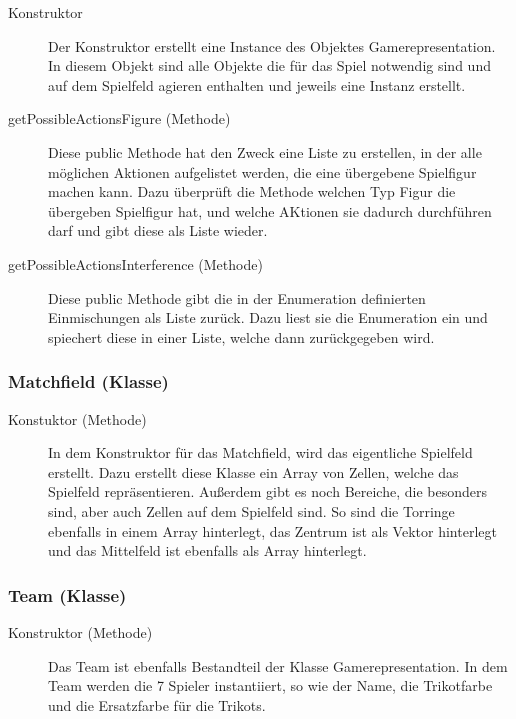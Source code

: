 		\begin{description}
                
			\item[Konstruktor]
			Der Konstruktor erstellt eine Instance des Objektes Gamerepresentation. In diesem Objekt sind alle Objekte die für das Spiel notwendig sind und auf dem Spielfeld agieren enthalten und jeweils eine Instanz erstellt.
                
        	\item[getPossibleActionsFigure (Methode)]
        	Diese public Methode hat den Zweck eine Liste zu erstellen, in der alle möglichen Aktionen aufgelistet werden, die eine übergebene Spielfigur machen kann. Dazu überprüft die Methode welchen Typ Figur die übergeben Spielfigur hat, und welche AKtionen sie dadurch durchführen darf und gibt diese als Liste wieder.
        	
        	\item[getPossibleActionsInterference (Methode)]
        	Diese public Methode gibt die in der Enumeration definierten Einmischungen als Liste zurück. Dazu liest sie die Enumeration ein und spiechert diese in einer Liste, welche dann zurückgegeben wird. 
        \end{description}
        	
        \subsubsection{Matchfield (Klasse)}
        \begin{description}
        	\item[Konstuktor (Methode)]
        	In dem Konstruktor für das Matchfield, wird das eigentliche Spielfeld erstellt. Dazu erstellt diese Klasse ein Array von Zellen, welche das Spielfeld repräsentieren. Außerdem gibt es noch Bereiche, die besonders sind, aber auch Zellen auf dem Spielfeld sind. So sind die Torringe ebenfalls in einem Array hinterlegt, das Zentrum ist als Vektor hinterlegt und das Mittelfeld ist ebenfalls als Array hinterlegt.
        \end{description}
        
        \subsubsection{Team (Klasse)}
        \begin{description}
        	\item[Konstruktor (Methode)]
        	Das Team ist ebenfalls Bestandteil der Klasse Gamerepresentation. In dem Team werden die 7 Spieler instantiiert, so wie der Name, die Trikotfarbe und die Ersatzfarbe für die Trikots.
        \end{description}
        
